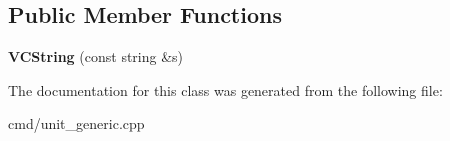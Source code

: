 \subsection*{Public Member Functions}
\begin{DoxyCompactItemize}
\item 
{\bfseries V\+C\+String} (const string \&s)\hypertarget{classVCString_a4ceaca7f62d698dc7bc14da6fa0d6635}{}\label{classVCString_a4ceaca7f62d698dc7bc14da6fa0d6635}

\end{DoxyCompactItemize}


The documentation for this class was generated from the following file\+:\begin{DoxyCompactItemize}
\item 
cmd/unit\+\_\+generic.\+cpp\end{DoxyCompactItemize}
